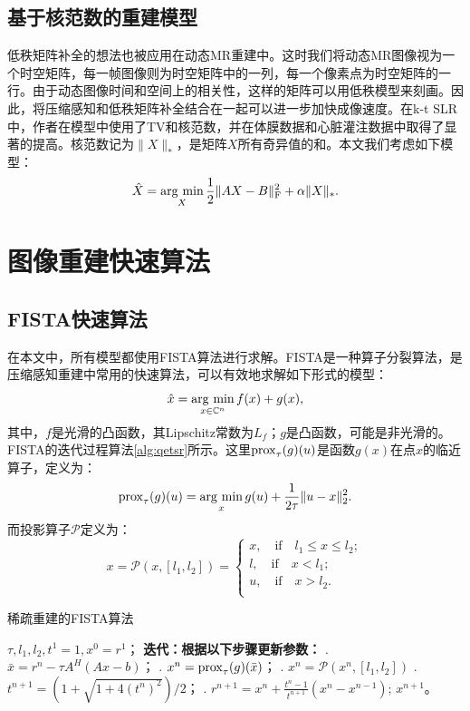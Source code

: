 \subsection{基于核范数的重建模型}
低秩矩阵补全的想法也被应用在动态MR重建中。这时我们将动态MR图像视为一个时空矩阵，每一帧图像则为时空矩阵中的一列，每一个像素点为时空矩阵的一行。由于动态图像时间和空间上的相关性，这样的矩阵可以用低秩模型来刻画。因此，将压缩感知和低秩矩阵补全结合在一起可以进一步加快成像速度。在k-t SLR中，作者在模型中使用了TV和核范数，并在体膜数据和心脏灌注数据中取得了显著的提高。核范数记为$\|X\|_*$，是矩阵$X$所有奇异值的和。本文我们考虑如下模型：
\begin{equation}
\hat{X} = \argmin_X{\frac{1}{2}\|AX-B\|^2_\mathrm{F} + \alpha\|X\|_*}.
\end{equation}

\section{图像重建快速算法}
\subsection{FISTA快速算法}
在本文中，所有模型都使用FISTA\cite{fista}算法进行求解。FISTA是一种算子分裂算法，是压缩感知重建中常用的快速算法，可以有效地求解如下形式的模型：
\begin{equation}
\hat{x} = \argmin_{x \in \mathbb{\mathbb{C}}^n} f(x) + g(x),
\end{equation}
其中，$f$是光滑的凸函数，其Lipschitz常数为$L_f$；$g$是凸函数，可能是非光滑的。FISTA的迭代过程算法\ref{alg:qetsr}所示。这里$\mathrm{prox}_\tau(g)(u)$是函数$g(x)$在点$x$的临近算子，定义为：
\begin{equation}
\prox_\tau(g)(u)=\argmin_x{g(u)+\frac{1}{2\tau}}\|u-x\|_2^2.
\label{equ:prox}
\end{equation}
而投影算子$\mathscr{P}$定义为：
\begin{equation}
x=\mathscr{P}(x,[l_1,l_2]) =
\left\{
\begin{array}{ll}
x, \quad \mbox{if} \quad l_1\leq x\leq l_2; \\
l, \quad \mbox{if} \quad x<l_1;\\
u, \quad \mbox{if} \quad x>l_2.\\
\end{array}\right.
\end{equation}

\begin{algorithm}
	\caption{稀疏重建的FISTA算法}
	\label{alg:qetsr}
	\begin{algorithmic}
		\REQUIRE $\tau, l_1, l_2, t^1=1, x^0=r^1$；
		\INDSTATE[-1.25] \textbf{迭代：根据以下步骤更新参数：}	
		. $\bar{x}=r^n-\tau A^H(Ax-b)$；
		. $x^n=\mathrm{prox}_{\tau}(g)(\bar{x})$；
		. $x^n=\mathscr{P}(x^n,[l_1,l_2])$
		. $t^{n+1}=(1+\sqrt{1+4(t^n)^2})/2$；
		. $r^{n+1}=x^n+\frac{t^n-1}{t^{n+1}}(x^n-x^{n-1})$;
		\ENSURE $x^{n+1}$。
	\end{algorithmic}
\end{algorithm}


